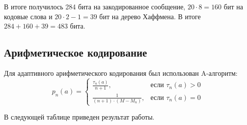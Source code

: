 В итоге получилось 284 бита на закодированное сообщение, $20 \cdot 8 = 160$ бит на кодовые слова и $20 \cdot 2 - 1 = 39$ бит на дерево Хаффмена. 
В итоге $284 + 160 + 39 = 483$ бита.

\subsection{Арифметическое кодирование}
Для адаптивного арифметического кодирования был использован A-алгоритм:
\begin{equation}
p_n(a) = \begin{cases}
            \frac{\tau_n(a)}{n + 1}, & \text{если $\tau_n(a) > 0$} \\
            \frac{1}{(n + 1) \cdot (M - M_n)}, & \text{если $\tau_n(a) = 0$}
        \end{cases}
\end{equation}
 
 
В следующей таблице приведен результат работы.

